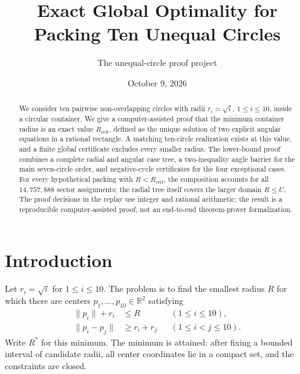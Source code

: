 \documentclass[11pt,a4paper]{article}
\title{Exact Global Optimality for Packing Ten Unequal Circles}
\author{The unequal-circle proof project}
\date{October 9, 2026}
\theoremstyle{remark}
\newcommand{\Ropt}{R^*}
\newcommand{\Rcrit}{R_{\mathrm{crit}}}
\newcommand{\norm}[1]{\lVert #1\rVert}
\begin{document}
\maketitle

\begin{abstract}
We consider ten pairwise non-overlapping circles with radii
$r_i=\sqrt{i}$, $1\le i\le 10$, inside a circular container.  We give a
computer-assisted proof that the minimum container radius is an exact value
$\Rcrit$, defined as the unique solution of two explicit angular equations in
a rational rectangle.  A matching ten-circle realization exists at this
value, and a finite global certificate excludes every smaller radius.  The
lower-bound proof combines a complete radial and angular case tree, a
two-inequality angle barrier for the main seven-circle order, and
negative-cycle certificates for the four exceptional cases.  For every
hypothetical packing with $R<\Rcrit$, the composition accounts for all
$14{,}757{,}888$ sector assignments; the radial tree itself covers the larger
domain $R\le U$.  The proof decisions in the replay use integer and
rational arithmetic; the result is a reproducible computer-assisted proof,
not an end-to-end theorem-prover formalization.
\end{abstract}

\section{Introduction}

Let $r_i=\sqrt{i}$ for $1\le i\le10$.  The problem is to find the smallest
radius $R$ for which there are centers $p_1,\ldots,p_{10}\in\mathbb R^2$
satisfying
\begin{align}
  \norm{p_i}+r_i&\le R
       &&(1\le i\le10), \label{eq:containment}\\
  \norm{p_i-p_j}&\ge r_i+r_j
       &&(1\le i<j\le10). \label{eq:separation}
\end{align}
Write $\Ropt$ for this minimum.  The minimum is attained: after fixing a
bounded interval of candidate radii, all center coordinates lie in a compact
set, and the constraints are closed.
\end{document}
